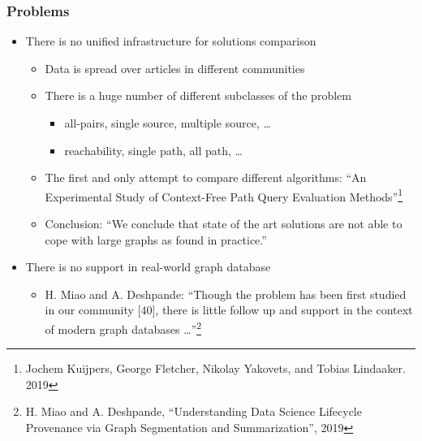 \documentclass[xcolor=table,aspectratio=169]{beamer}
\begin{document}
\begin{frame}[fragile]
  \frametitle{Problems}
  \begin{itemize}    
    \item There is no unified infrastructure for solutions comparison
    \begin{itemize}
      \item Data is spread over articles in different communities
      \item There is a huge number of different subclasses of the problem
      \begin{itemize}
        \item all-pairs, single source, multiple source, \dots 
        \item reachability, single path, all path, \dots 
      \end{itemize}
      \item The first and only attempt to compare different algorithms: ``An Experimental Study of Context-Free Path Query Evaluation Methods''\footnote{Jochem Kuijpers, George Fletcher, Nikolay Yakovets, and Tobias Lindaaker. 2019}
      \pause
      \item Conclusion: ``We conclude that state of the art solutions are not able to cope with large graphs as found in practice.''
    \end{itemize}
    \pause
    \item There is no support in real-world graph database
    \begin{itemize}
      \item H. Miao and A. Deshpande: ``Though the problem has been first studied in our community [40], there is little follow up and support in the context of modern graph databases \dots''\footnote{H. Miao and A. Deshpande,  ``Understanding Data Science Lifecycle Provenance via Graph Segmentation and Summarization'', 2019}       
    \end{itemize}
    
  \end{itemize}
\end{frame}
\end{document}
